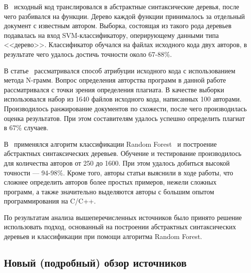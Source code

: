 В~\cite{pellin} исходный код транслировался в абстрактные синтаксические деревья, после чего разбивался на функции. Дерево каждой функции принималось за отдельный документ с известным автором. Выборка, состоящая из такого рода деревьев подавалась на вход SVM-классификатору, оперирующему данными типа <<дерево>>. Классификатор обучался на файлах исходного кода двух авторов, в результате чего удалось достичь точности около 67-88\%.

В статье~\cite{burrows} рассматривался способ атрибуции исходного кода с использованием метода N-грамм. Вопрос определения авторства программ в данной работе рассматривался с точки зрения определения плагиата. В качестве выборки использовался набор из 1640 файлов исходного кода, написанных 100 авторами. Производилось ранжирование документов по схожести, после чего производилась оценка результатов. При этом составителям удалось успешно определить плагиат в 67\% случаев.

В~\cite{caliskan} применялся алгоритм классификации Random Forest~\cite{random_forest} и построение абстрактных синтаксических деревьев. Обучение и тестирование производилось для количества авторов от 250 до 1600. При этом удалось добиться высокой точности --- 94-98\%. Кроме того, авторы статьи выяснили в ходе работы, что сложнее определить авторов более простых примеров, нежели сложных программ, а также значительно выделяются авторы с большим опытом программирования на C/C++.

По результатам анализа вышеперечисленных источников было принято решение использовать подход, основанный на построении абстрактных синтаксических деревьев и классификации при помощи алгоритма Random Forest.





\subsection{Новый (подробный) обзор источников}










